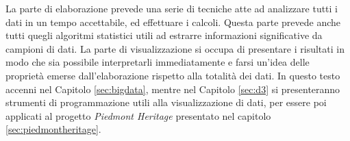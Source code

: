 La parte di elaborazione prevede una serie di tecniche atte ad analizzare tutti i dati in un tempo accettabile, ed effettuare i calcoli. Questa parte prevede anche tutti quegli algoritmi statistici utili ad estrarre informazioni significative da campioni di dati.
La parte di visualizzazione si occupa di presentare i risultati in modo che sia possibile interpretarli immediatamente e farsi un'idea delle proprietà emerse dall'elaborazione rispetto alla totalità dei dati.
In questo testo accenni nel Capitolo \ref{sec:bigdata}, mentre nel Capitolo \ref{sec:d3} si presenteranno strumenti di programmazione utili alla visualizzazione di dati, per essere poi applicati al progetto \emph{Piedmont Heritage} presentato nel capitolo \ref{sec:piedmontheritage}.
